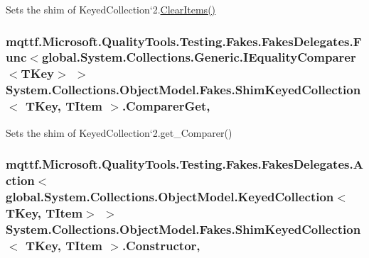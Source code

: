 Sets the shim of Keyed\-Collection`2.\hyperlink{class_system_1_1_collections_1_1_object_model_1_1_fakes_1_1_shim_keyed_collection_3_01_t_key_00_01_t_item_01_4_ae47c122bb5dbf14a2db7866c775ede1f}{Clear\-Items()}

\hypertarget{class_system_1_1_collections_1_1_object_model_1_1_fakes_1_1_shim_keyed_collection_3_01_t_key_00_01_t_item_01_4_ad685c8f38437ab5bd340dadfeefccfb7}{
\subsubsection[{Comparer\-Get}]{\setlength{\rightskip}{0pt plus 5cm}mqttf.\-Microsoft.\-Quality\-Tools.\-Testing.\-Fakes.\-Fakes\-Delegates.\-Func$<$global.\-System.\-Collections.\-Generic.\-I\-Equality\-Comparer$<$T\-Key$>$ $>$ System.\-Collections.\-Object\-Model.\-Fakes.\-Shim\-Keyed\-Collection$<$ T\-Key, T\-Item $>$.Comparer\-Get\hspace{0.3cm}{\ttfamily [get]}, {\ttfamily [set]}}}\label{class_system_1_1_collections_1_1_object_model_1_1_fakes_1_1_shim_keyed_collection_3_01_t_key_00_01_t_item_01_4_ad685c8f38437ab5bd340dadfeefccfb7}


Sets the shim of Keyed\-Collection`2.get\-\_\-\-Comparer()

\hypertarget{class_system_1_1_collections_1_1_object_model_1_1_fakes_1_1_shim_keyed_collection_3_01_t_key_00_01_t_item_01_4_aab84a973e3999d276ca81c00259643b5}{
\subsubsection[{Constructor}]{\setlength{\rightskip}{0pt plus 5cm}mqttf.\-Microsoft.\-Quality\-Tools.\-Testing.\-Fakes.\-Fakes\-Delegates.\-Action$<$global.\-System.\-Collections.\-Object\-Model.\-Keyed\-Collection$<$T\-Key, T\-Item$>$ $>$ System.\-Collections.\-Object\-Model.\-Fakes.\-Shim\-Keyed\-Collection$<$ T\-Key, T\-Item $>$.Constructor\hspace{0.3cm}{\ttfamily [static]}, {\ttfamily [set]}}}\label{class_system_1_1_collections_1_1_object_model_1_1_fakes_1_1_shim_keyed_collection_3_01_t_key_00_01_t_item_01_4_aab84a973e3999d276ca81c00259643b5}


